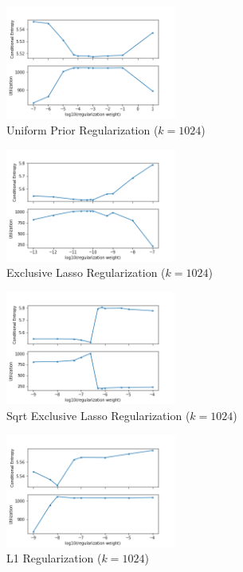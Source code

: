 \documentclass[11pt,letterpaper]{article}
\begin{document}
\begin{figure}
  \caption{Uniform Prior Regularization ($k=1024$)}
\label{f:fb}
  \centering
    \includegraphics[width=0.5\textwidth]{skipgram_flat_b.png}
\end{figure}
\begin{figure}
  \caption{Exclusive Lasso Regularization ($k=1024$)}
\label{f:fel}
  \centering
    \includegraphics[width=0.5\textwidth]{skipgram_flat_el.png}
\end{figure}
\begin{figure}
  \caption{Sqrt Exclusive Lasso Regularization ($k=1024$)}
\label{f:fels}
  \centering
    \includegraphics[width=0.5\textwidth]{skipgram_flat_els.png}
\end{figure}
\begin{figure}
  \caption{L1 Regularization ($k=1024$)}
\label{f:fl1}
  \centering
    \includegraphics[width=0.5\textwidth]{skipgram_flat_l1.png}
\end{figure}
\end{document}
